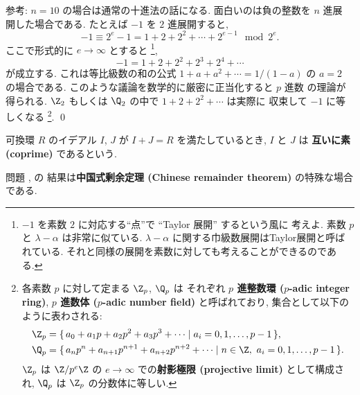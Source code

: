 \documentclass[12pt,twoside]{jarticle}
\begin{document}
\medskip
\noindent
参考: $n=10$ の場合は通常の十進法の話になる.  面白いのは負の整数を $n$ 進展
開した場合である. たとえば $-1$ を $2$ 進展開すると,
\begin{equation*}
  -1 \equiv 2^e - 1 = 1 + 2 + 2^2 + \cdots + 2^{e-1} \mod 2^e.
\end{equation*}
ここで形式的に $e\to\infty$ とすると%
\footnote{$-1$ を素数 $2$ に対応する``点''で ``Taylor 展開'' するという風に
  考えよ.  素数 $p$ と $\lambda-\alpha$ は非常に似ている.  
  $\lambda-\alpha$ に関する巾級数展開はTaylor展開と呼ばれている.
  それと同様の展開を素数に対しても考えることができるのである. },
\begin{equation*}
  -1 = 1 + 2 + 2^2 + 2^3 + 2^4 + \cdots
\end{equation*}
が成立する.  これは等比級数の和の公式 $1 + a + a^2 + \cdots = 1/(1-a)$ 
の $a=2$ の場合である.  このような議論を数学的に厳密に正当化すると $p$ 進数
の理論が得られる.  $\Z_2$ もしくは $\Q_2$ の中で $1+2+2^2+\cdots$ は実際に
収束して $-1$ に等しくなる%
\footnote{各素数 $p$ に対して定まる $\Z_p$, $\Q_p$ は
  それぞれ {\bf $p$ 進整数環 ($p$-adic integer ring)}, 
  {\bf $p$ 進数体 ($p$-adic number field)} と呼ばれており, 
  集合として以下のように表わされる:
  \begin{align*}
    & 
    \Z_p =
    \{\, a_0 + a_1 p + a_2 p^2 + a_3 p^3 + \cdots
    \mid a_i=0,1,\dots,p-1 \,\},
    \\ &
    \Q_p =
    \{\, a_n p^n + a_{n+1}p^{n+1} + a_{n+2} p^{n+2} + \cdots
    \mid n\in\Z,\ a_i=0,1,\dots,p-1 \,\}.
  \end{align*}
  $\Z_p$ は $\Z/p^e\Z$ の $e\to\infty$ での{\bf 射影極限 (projective limit)}
  として構成され, $\Q_p$ は $\Z_p$ の分数体に等しい.
  }.  %
\qed


可換環 $R$ のイデアル $I$, $J$ が $I+J=R$ を満たしているとき, $I$ と $J$ は
{\bf 互いに素 (coprime)} であるという. 

問題 ,  の
結果は{\bf 中国式剰余定理 (Chinese remainder theorem)} の特殊な場合である.
\end{document}
